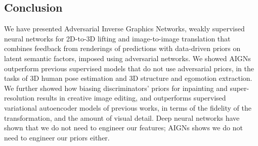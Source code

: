 \documentclass[10pt,twocolumn,letterpaper]{article}
\begin{document}
\begin{bibunit}[ieee]
\section{Conclusion}
We have presented Adversarial Inverse Graphics Networks, weakly supervised neural networks for 2D-to-3D lifting and image-to-image translation that combines feedback from  renderings of predictions with data-driven priors on  latent semantic factors, imposed using adversarial networks. %
We showed AIGNs outperform  previous supervised models that do not use adversarial priors, in the tasks of 3D human pose estimation and  3D structure and egomotion extraction. We further showed how biasing discriminators' priors  for inpainting and super-resolution results in creative image editing, and outperforms supervised variational autoencoder models of previous works, in terms of the fidelity of the transformation, and the amount of visual detail. Deep neural networks have shown that we do not need to engineer our features; AIGNs shows we do not need to engineer our priors either.
\begin{comment}
We have presented a weakly supervised  inverse model of images that predicts imaginations of hidden representations which then renders through image formation or layering to reconstruct the original image. 
It regularizes the inferred hidden representations using  convolutional adversarial priors by distribution matching against retrieved relevant memories.
It does not assume paired supervision and can handle multimodal imagination spaces. 
We have empirically validated are design choices of %
fully-convolutional adversarial discriminator networks and  relevant memory retrieval. We believe the proposed learning paradigm better exploits unlabelled data in the form of images, depth maps, albedo, shading or segmentation maps and complements well human paired annotations. 
\end{comment}%


\putbib[refs]
\end{bibunit}
\end{document}
